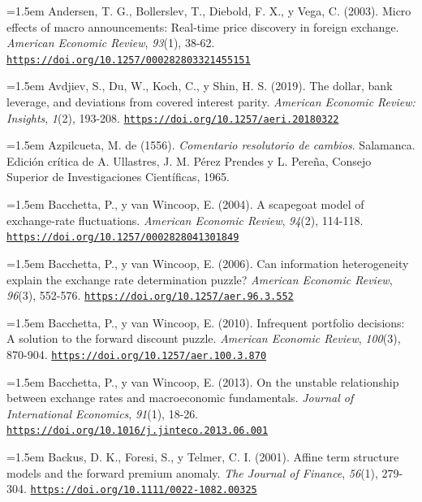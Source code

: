 \documentclass[10pt,a4paper]{article}
\begin{document}
\begin{sloppypar}\noindent\hangindent=1.5em Andersen, T. G., Bollerslev, T., Diebold, F. X., y Vega, C. (2003). Micro effects of macro announcements: Real-time price discovery in foreign exchange. \textit{American Economic Review}, \textit{93}(1), 38-62. \href{https://doi.org/10.1257/000282803321455151}{\nolinkurl{https://doi.org/10.1257/000282803321455151}}\end{sloppypar}

\noindent\hangindent=1.5em Avdjiev, S., Du, W., Koch, C., y Shin, H. S. (2019). The dollar, bank leverage, and deviations from covered interest parity. \textit{American Economic Review: Insights}, \textit{1}(2), 193-208. \href{https://doi.org/10.1257/aeri.20180322}{\nolinkurl{https://doi.org/10.1257/aeri.20180322}}

\noindent\hangindent=1.5em Azpilcueta, M. de (1556). \textit{Comentario resolutorio de cambios}. Salamanca. Edición crítica de A. Ullastres, J. M. Pérez Prendes y L. Pereña, Consejo Superior de Investigaciones Científicas, 1965.

\noindent\hangindent=1.5em Bacchetta, P., y van Wincoop, E. (2004). A scapegoat model of exchange-rate fluctuations. \textit{American Economic Review}, \textit{94}(2), 114-118. \href{https://doi.org/10.1257/0002828041301849}{\nolinkurl{https://doi.org/10.1257/0002828041301849}}

\noindent\hangindent=1.5em Bacchetta, P., y van Wincoop, E. (2006). Can information heterogeneity explain the exchange rate determination puzzle? \textit{American Economic Review}, \textit{96}(3), 552-576. \href{https://doi.org/10.1257/aer.96.3.552}{\nolinkurl{https://doi.org/10.1257/aer.96.3.552}}

\noindent\hangindent=1.5em Bacchetta, P., y van Wincoop, E. (2010). Infrequent portfolio decisions: A solution to the forward discount puzzle. \textit{American Economic Review}, \textit{100}(3), 870-904. \href{https://doi.org/10.1257/aer.100.3.870}{\nolinkurl{https://doi.org/10.1257/aer.100.3.870}}

\noindent\hangindent=1.5em Bacchetta, P., y van Wincoop, E. (2013). On the unstable relationship between exchange rates and macroeconomic fundamentals. \textit{Journal of International Economics}, \textit{91}(1), 18-26. \href{https://doi.org/10.1016/j.jinteco.2013.06.001}{\nolinkurl{https://doi.org/10.1016/j.jinteco.2013.06.001}}

\noindent\hangindent=1.5em Backus, D. K., Foresi, S., y Telmer, C. I. (2001). Affine term structure models and the forward premium anomaly. \textit{The Journal of Finance}, \textit{56}(1), 279-304. \href{https://doi.org/10.1111/0022-1082.00325}{\nolinkurl{https://doi.org/10.1111/0022-1082.00325}}
\end{document}
